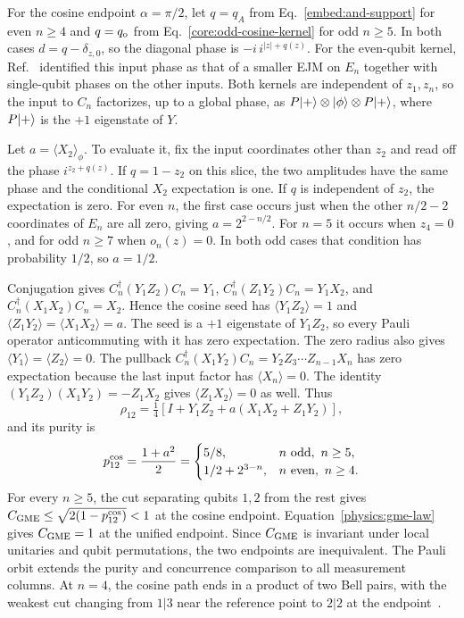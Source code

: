 For the cosine endpoint $\alpha=\pi/2$, let $q=q_A$ from Eq.~\eqref{embed:and-support} for even $n\ge4$ and $q=q_{\rm o}$ from Eq.~\eqref{core:odd-cosine-kernel} for odd $n\ge5$. In both cases $d=q-\delta_{z,0}$, so the diagonal phase is $-i\,i^{|z|+q(z)}$. For the even-qubit kernel, Ref.~\cite{PauwelsGisin2026} identified this input phase as that of a smaller EJM on $E_n$ together with single-qubit phases on the other inputs. Both kernels are independent of $z_1,z_n$, so the input to $C_n$ factorizes, up to a global phase, as $P\lvert +\rangle\otimes\lvert \phi\rangle\otimes P\lvert +\rangle$, where $P\lvert +\rangle$ is the $+1$ eigenstate of $Y$.

Let $a=\langle X_2\rangle_\phi$. To evaluate it, fix the input coordinates other than $z_2$ and read off the phase $i^{z_2+q(z)}$. If $q=1-z_2$ on this slice, the two amplitudes have the same phase and the conditional $X_2$ expectation is one. If $q$ is independent of $z_2$, the expectation is zero. For even $n$, the first case occurs just when the other $n/2-2$ coordinates of $E_n$ are all zero, giving $a=2^{2-n/2}$. For $n=5$ it occurs when $z_4=0$, and for odd $n\ge7$ when $o_n(z)=0$. In both odd cases that condition has probability $1/2$, so $a=1/2$.

Conjugation gives $C_n^\dagger(Y_1Z_2)C_n=Y_1$, $C_n^\dagger(Z_1Y_2)C_n=Y_1X_2$, and $C_n^\dagger(X_1X_2)C_n=X_2$. Hence the cosine seed has $\langle Y_1Z_2\rangle=1$ and $\langle Z_1Y_2\rangle=\langle X_1X_2\rangle=a$. The seed is a $+1$ eigenstate of $Y_1Z_2$, so every Pauli operator anticommuting with it has zero expectation. The zero radius also gives $\langle Y_1\rangle=\langle Z_2\rangle=0$. The pullback $C_n^\dagger(X_1Y_2)C_n=Y_2Z_3\cdots Z_{n-1}X_n$ has zero expectation because the last input factor has $\langle X_n\rangle=0$. The identity $(Y_1Z_2)(X_1Y_2)=-Z_1X_2$ gives $\langle Z_1X_2\rangle=0$ as well. Thus
\[
 \rho_{12}=\tfrac14[I+Y_1Z_2+a(X_1X_2+Z_1Y_2)],
\]
and its purity is
\begin{equation}
 p_{12}^{\rm cos}=\frac{1+a^2}{2}
 =\begin{cases}
  5/8,& n\ \text{odd},\ n\ge5,\\
  1/2+2^{3-n},& n\ \text{even},\ n\ge4.
 \end{cases}
 \label{physics:cosine-pair-purity}
\end{equation}
For every $n\ge5$, the cut separating qubits $1,2$ from the rest gives $C_{\rm GME}\le\sqrt{2(1-p_{12}^{\rm cos})}<1$ at the cosine endpoint. Equation~\eqref{physics:gme-law} gives $C_{\rm GME}=1$ at the unified endpoint. Since $C_{\rm GME}$ is invariant under local unitaries and qubit permutations, the two endpoints are inequivalent. The Pauli orbit extends the purity and concurrence comparison to all measurement columns. At $n=4$, the cosine path ends in a product of two Bell pairs, with the weakest cut changing from $1|3$ near the reference point to $2|2$ at the endpoint~\cite{PauwelsGisin2026}.

